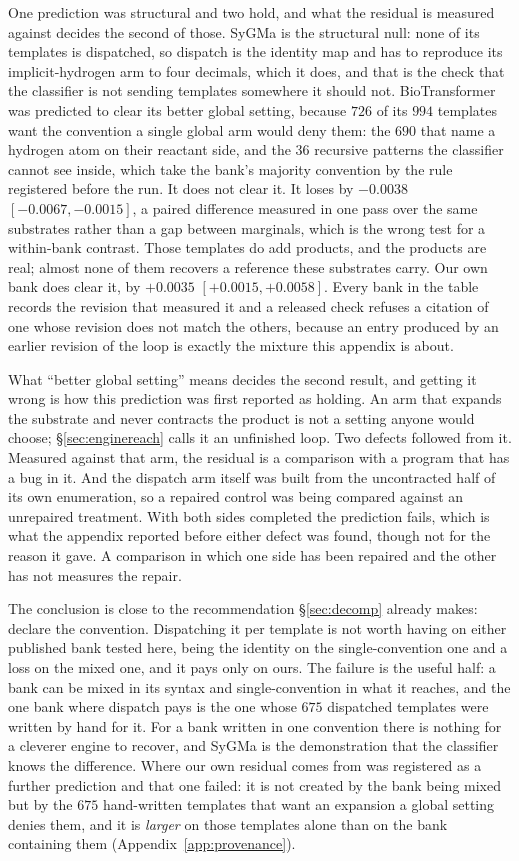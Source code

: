 One prediction was structural and two hold, and what the residual is measured against decides the
second of those. SyGMa is the structural null: none of its templates is dispatched, so dispatch is
the identity map and has to reproduce its implicit-hydrogen arm to four decimals, which it does,
and that is the check that the classifier is not sending templates somewhere it should not.
BioTransformer was predicted to clear its better global setting, because $726$ of its $994$
templates want the convention a single global arm would deny them: the $690$ that name a hydrogen
atom on their reactant side, and the $36$ recursive patterns the classifier cannot see inside, which
take the bank's majority convention by the rule registered before the run. It does not clear it. It
loses by $-0.0038$ $[-0.0067,-0.0015]$, a paired difference measured in one pass over the same
substrates rather than a gap between marginals, which is the wrong test for a within-bank contrast.
Those templates do add products, and the products are real; almost none of them recovers a reference
these substrates carry. Our own bank does clear it, by $+0.0035$ $[+0.0015,+0.0058]$. Every bank in
the table records the revision that measured it and a released check refuses a citation of one whose
revision does not match the others, because an entry produced by an earlier revision of the loop is
exactly the mixture this appendix is about.

What ``better global setting'' means decides the second result, and getting it wrong is how this
prediction was first reported as holding. An arm that expands the substrate and never contracts the
product is not a setting anyone would choose; \S\ref{sec:enginereach} calls it an unfinished loop.
Two defects followed from it. Measured against that arm, the residual is a comparison with a program
that has a bug in it. And the dispatch arm itself was built from the uncontracted half of its own
enumeration, so a repaired control was being compared against an unrepaired treatment. With both
sides completed the prediction fails, which is what the appendix reported before either defect was
found, though not for the reason it gave. A comparison in which one side has been repaired and the
other has not measures the repair.

The conclusion is close to the recommendation \S\ref{sec:decomp} already makes: declare the
convention. Dispatching it per template is not worth having on either published bank tested here,
being the identity on the single-convention one and a loss on the mixed one, and it pays only on
ours. The failure is the useful half: a bank can be mixed in its syntax and single-convention in
what it reaches, and the one bank where dispatch pays is the one whose $675$ dispatched templates
were written by hand for it. For a bank written in one convention there is
nothing for a cleverer engine to recover, and SyGMa is the demonstration that the classifier knows
the difference. Where our own residual comes from was registered as a further prediction and that
one failed: it is not created by the bank being mixed but by the $675$ hand-written templates that
want an expansion a global setting denies them, and it is \emph{larger} on those templates alone
than on the bank containing them (Appendix~\ref{app:provenance}).

